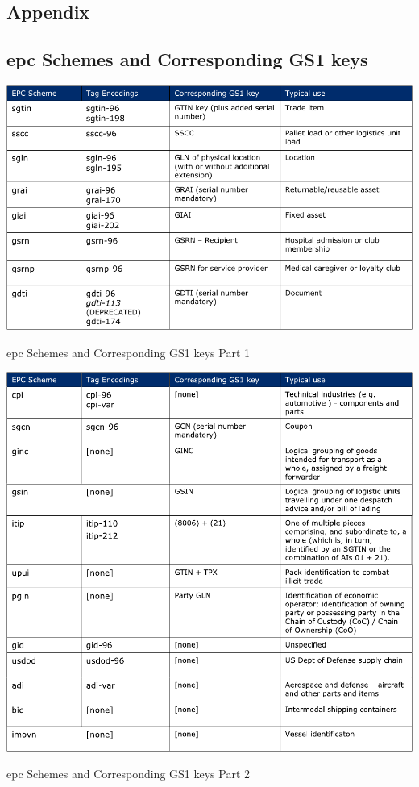 \renewcommand{\thesection}{\Alph{section}}

\begin{appendices}
\chapter{Appendix}

\section{\ac{epc} Schemes and Corresponding GS1 keys} \label{anx:epccodingschemes}
\begin{table}[!ht]
    \centering
    \includegraphics[width=\textwidth]{./figs/02-state-of-the-art/epcschemes.pdf}
    \caption[\ac{epc} Schemes and Corresponding GS1 keys Part 1]{\ac{epc} Schemes and Corresponding GS1 keys Part 1~\cite{EPCTagData}}
\end{table}

\begin{table}
    \centering
    \includegraphics[width=\textwidth]{./figs/02-state-of-the-art/epcschemes2.pdf}
    \caption[\ac{epc} Schemes and Corresponding GS1 keys Part 2]{\ac{epc} Schemes and Corresponding GS1 keys Part 2~\cite{EPCTagData}}
\end{table}


\end{appendices}
